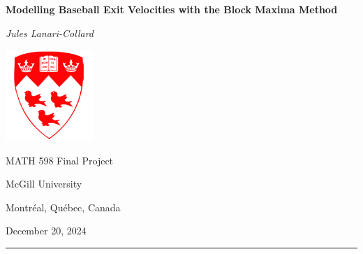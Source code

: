 \begin{titlepage}
		\begin{center}
			\vspace*{0.5cm}

			\LARGE
			\textbf{Modelling Baseball Exit Velocities with the Block Maxima Method}
			
			\vspace{1cm}
			
			\textit{Jules Lanari-Collard}
			
			\vspace{1.2cm}
			
			\includegraphics[width=0.25\textwidth]{mcglogo.png}
			
			\Large
			MATH 598 Final Project
			
			\vspace{-5mm}
			McGill University
			
			\vspace{-5mm}
			Montr\'eal, Qu\'ebec, Canada
			
			\vspace{5mm}
			December 20, 2024
			\small
			\vspace{0.5cm}
			{\color{red} \hrule height 0.75mm}
			\vspace{0.2cm}
		\end{center}
\end{titlepage}